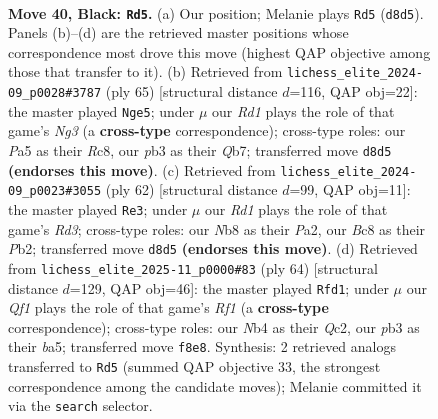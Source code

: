 \documentclass[11pt]{article}
\begin{document}
\begin{figure}[p]
\label{fig:thought-m77}
\end{figure}

\clearpage

\begin{figure}[p]\centering
\begin{subfigure}{0.46\textwidth}\centering
\resizebox{\linewidth}{!}{%
\newchessgame
\chessboard[
  setfen={rnbr1q2/1p4k1/4p3/p4p1p/PnNR1P2/1P2QNP1/4B1KP/7R b - - 0 40},
  showmover=false,
  pgfstyle=straightmove, color=movearrow, markmove={d8-d5}
]}
\caption{}
\end{subfigure}\hfill
\begin{subfigure}{0.46\textwidth}\centering
\resizebox{\linewidth}{!}{%
\newchessgame
\chessboard[
  setfen={2r5/1q1r1p1k/ppnpp1np/5P2/2P1P3/1P2N3/PBQ1NK2/6R1 b - - 0 33},
  showmover=false,
  pgfstyle=straightmove, color=movearrow, markmove={g6-e5}
]}
\caption{}
\end{subfigure}
\\[4pt]
\begin{subfigure}{0.46\textwidth}\centering
\resizebox{\linewidth}{!}{%
\newchessgame
\chessboard[
  setfen={2kr4/pp1n1n2/2p1qp2/3p1N2/3Pp1P1/3R1P2/PPPQ1KB1/8 w - - 2 32},
  showmover=false,
  pgfstyle=straightmove, color=movearrow, markmove={d3-e3}
]}
\caption{}
\end{subfigure}\hfill
\begin{subfigure}{0.46\textwidth}\centering
\resizebox{\linewidth}{!}{%
\newchessgame
\chessboard[
  setfen={1r1r2k1/1p2qpp1/1n2p2p/bPp1P3/2P1NP2/3R1B1P/2Q3P1/5R1K w - - 1 33},
  showmover=false,
  pgfstyle=straightmove, color=movearrow, markmove={f1-d1}
]}
\caption{}
\end{subfigure}
\caption{\textbf{Move 40, Black: \texttt{Rd5}.} (a) Our position; Melanie plays \texttt{Rd5} (\texttt{d8d5}). Panels (b)--(d) are the retrieved master positions whose correspondence most drove this move (highest QAP objective among those that transfer to it). (b) Retrieved from \texttt{lichess\_elite\_2024-09\_p0028\#3787} (ply 65) [structural distance $d$=116, QAP obj=22]: the master played \texttt{Nge5}; under $\mu$ our \emph{Rd1} plays the role of that game's \emph{Ng3} (a \textbf{cross-type} correspondence); cross-type roles: our \emph{P}a5 as their \emph{R}c8, our \emph{p}b3 as their \emph{Q}b7; transferred move \texttt{d8d5} \textbf{(endorses this move)}. (c) Retrieved from \texttt{lichess\_elite\_2024-09\_p0023\#3055} (ply 62) [structural distance $d$=99, QAP obj=11]: the master played \texttt{Re3}; under $\mu$ our \emph{Rd1} plays the role of that game's \emph{Rd3}; cross-type roles: our \emph{N}b8 as their \emph{P}a2, our \emph{B}c8 as their \emph{P}b2; transferred move \texttt{d8d5} \textbf{(endorses this move)}. (d) Retrieved from \texttt{lichess\_elite\_2025-11\_p0000\#83} (ply 64) [structural distance $d$=129, QAP obj=46]: the master played \texttt{Rfd1}; under $\mu$ our \emph{Qf1} plays the role of that game's \emph{Rf1} (a \textbf{cross-type} correspondence); cross-type roles: our \emph{N}b4 as their \emph{Q}c2, our \emph{p}b3 as their \emph{b}a5; transferred move \texttt{f8e8}. Synthesis: 2 retrieved analogs transferred to \texttt{Rd5} (summed QAP objective 33, the strongest correspondence among the candidate moves); Melanie committed it via the \texttt{search} selector.}

\end{figure}
\end{document}
